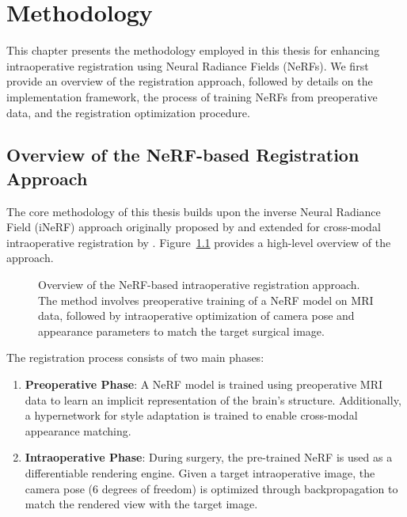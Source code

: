 
\chapter{Methodology}\label{chapter:methodology}

This chapter presents the methodology employed in this thesis for enhancing intraoperative registration using Neural Radiance Fields (NeRFs). We first provide an overview of the registration approach, followed by details on the implementation framework, the process of training NeRFs from preoperative data, and the registration optimization procedure.

\section{Overview of the NeRF-based Registration Approach}

The core methodology of this thesis builds upon the inverse Neural Radiance Field (iNeRF) approach originally proposed by \textcite{yen2020inerf} and extended for cross-modal intraoperative registration by \textcite{fehrentz2024intraoperative}. Figure~\ref{fig:overview} provides a high-level overview of the approach.

\begin{figure}[htpb]
  \centering
  \caption{Overview of the NeRF-based intraoperative registration approach. The method involves preoperative training of a NeRF model on MRI data, followed by intraoperative optimization of camera pose and appearance parameters to match the target surgical image.}
  \label{fig:overview}
\end{figure}

The registration process consists of two main phases:

\begin{enumerate}
    \item \textbf{Preoperative Phase}: A NeRF model is trained using preoperative MRI data to learn an implicit representation of the brain's structure. Additionally, a hypernetwork for style adaptation is trained to enable cross-modal appearance matching.
    
    \item \textbf{Intraoperative Phase}: During surgery, the pre-trained NeRF is used as a differentiable rendering engine. Given a target intraoperative image, the camera pose (6 degrees of freedom) is optimized through backpropagation to match the rendered view with the target image.
\end{enumerate}

